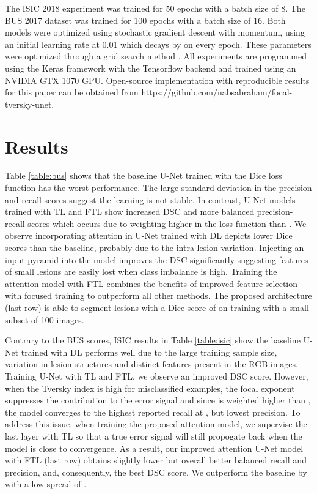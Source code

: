 \documentclass{article}
\begin{document}
The ISIC 2018 experiment was trained for 50 epochs with a batch size of 8. The BUS 2017 dataset was trained for 100 epochs with a batch size of 16. Both models were optimized using stochastic gradient descent with momentum, using an initial learning rate at 0.01 which decays by  on every epoch. These parameters were optimized through a grid search method \cite{gridsearch}. All experiments are programmed using the Keras framework with the Tensorflow backend and trained using an NVIDIA GTX 1070 GPU. Open-source implementation with reproducible results for this paper can be obtained from https://github.com/nabsabraham/focal-tversky-unet.

\section{Results}
Table \ref{table:bus} shows that the baseline U-Net trained with the Dice loss function has the worst performance. The large standard deviation in the precision and recall scores suggest the learning is not stable. In contrast, U-Net models trained with TL and FTL show increased DSC and more balanced precision-recall scores which occurs due to weighting  higher in the loss function than . We observe incorporating attention in U-Net trained with DL depicts lower Dice scores than the baseline, probably due to the intra-lesion variation. Injecting an input pyramid into the model improves the DSC significantly suggesting features of small lesions are easily lost when class imbalance is high. Training the attention model with FTL combines the benefits of improved feature selection with focused training to outperform all other methods. The proposed architecture (last row) is able to segment lesions with a Dice score of  on training with a small subset of 100 images. 

Contrary to the BUS scores, ISIC results in Table \ref{table:isic} show the baseline U-Net trained with DL performs well due to the large training sample size, variation in lesion structures and distinct features present in the RGB images. Training U-Net with TL and FTL, we observe an improved DSC score. However, when the Tversky index is high for misclassified examples, the focal exponent  suppresses the contribution to the error signal and since  is weighted higher than , the model converges to the highest reported recall at , but lowest precision. To address this issue, when training the proposed attention model, we supervise the last layer with TL so that a true error signal will still propogate back when the model is close to convergence. As a result, our improved attention U-Net model with FTL (last row) obtains slightly lower but overall better balanced recall and precision, and, consequently, the best DSC score. We outperform the baseline by  with a low spread of . 
\end{document}
